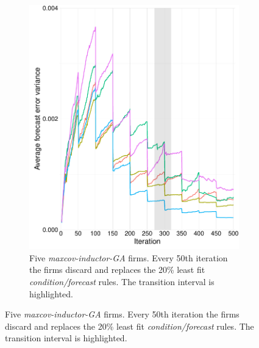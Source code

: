 \documentclass[preprint, 12pt]{elsarticle}
\begin{document}
\begin{figure}[hb!]
\begin{subfigure}[t]{0.485\textwidth}
		\includegraphics[width=\textwidth, trim={4mm 0 0 0}]{Graphics/fig6a_miga.pdf}
		\caption{Five \emph{maxcov-inductor-GA} firms. Every 50th iteration the firms discard and replaces the 20\% least fit \emph{condition/forecast} rules. The transition interval is highlighted.}
		\label{fig:accuracy_mi}
	\end{subfigure}
	
	\label{fig:accuracy}
\end{figure}
\end{document}
